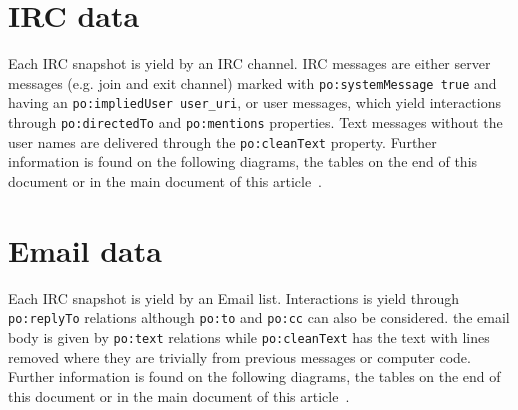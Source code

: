 \documentclass[review]{elsarticle}
\newcommand{\textttt}[1] {\texttt{\footnotesize#1}}
\begin{document}
\section{IRC data}
Each IRC snapshot is yield by an IRC channel.
IRC messages are either server messages (e.g. join and exit channel)
marked with \textttt{po:systemMessage true} and having an \textttt{po:impliedUser user\_uri},
or user messages, which yield interactions through \textttt{po:directedTo} and \textttt{po:mentions} properties.
Text messages without the user names are delivered through the \textttt{po:cleanText} property.
Further information is found on the following diagrams, the tables on
the end of this document or in the main document of this
article~\cite{losd}.

\section{Email data}
Each IRC snapshot is yield by an Email list.
Interactions is yield through \textttt{po:replyTo} relations
although \textttt{po:to} and \textttt{po:cc} can also be considered.
the email body is given by \textttt{po:text} relations while
\textttt{po:cleanText} has the text with lines removed where they are
trivially from previous messages or computer code.
Further information is found on the following diagrams, the tables on
the end of this document or in the main document of this
article~\cite{losd}.
\end{document}
